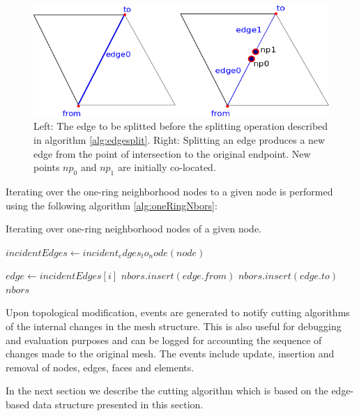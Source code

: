 \begin{figure}[H]
  \centering
  \includegraphics[width=0.8\linewidth]{figures/cutting/splitedge.png}
  \caption{\label{fig:splitedge}
  {Left: The edge to be splitted before the splitting operation described in algorithm \ref{alg:edgesplit}. 
  Right: Splitting an edge produces a new edge from the point of intersection to the original endpoint. New points $np_0$ and $np_1$ are
  initially co-located.}
}
\end{figure}


Iterating over the one-ring neighborhood nodes to a given node is performed using the following algorithm \ref{alg:oneRingNbors}:

\begin{algorithm}[H]
\caption{Iterating over one-ring neighborhood nodes of a given node.}
\label{alg:oneRingNbors}
\begin{algorithmic}[1]	
  \STATE $incidentEdges \gets incident_edges_to_node(node)$
  
  \STATE $edge \gets incidentEdges\left[i\right]$
  \STATE $nbors.insert(edge.from)$
  \ELSE
  \STATE $nbors.insert(edge.to)$
  \ENDIF
  \ENDFOR
  \RETURN $nbors$
\end{algorithmic}
\end{algorithm}

Upon topological modification, events are generated to notify cutting algorithms of the internal changes in the mesh structure. 
This is also useful for debugging and evaluation purposes and can be logged for accounting the sequence of changes made to the 
original mesh. The events include update, insertion and removal of nodes, edges, faces and elements.


In the next section we describe the cutting algorithm which is based on the edge-based data structure presented in this section.

